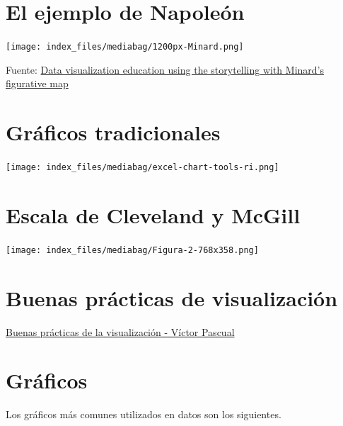 \documentclass[
  letterpaper,
  DIV=11,
  numbers=noendperiod]{scrreprt}
\begin{document}
\section{El ejemplo de Napoleón}\label{el-ejemplo-de-napoleuxf3n}

\texttt{[image: index\_files/mediabag/1200px-Minard.png]}

Fuente:
\href{https://www.researchgate.net/publication/327579298_Data_visualization_education_using_the_storytelling_with_Minard's_figurative_map}{Data
visualization education using the storytelling with Minard's figurative
map}

\section{Gráficos tradicionales}\label{gruxe1ficos-tradicionales}

\texttt{[image: index\_files/mediabag/excel-chart-tools-ri.png]}

\section{Escala de Cleveland y
McGill}\label{escala-de-cleveland-y-mcgill}

\texttt{[image: index\_files/mediabag/Figura-2-768x358.png]}

\section{Buenas prácticas de
visualización}\label{buenas-pruxe1cticas-de-visualizaciuxf3n}

\href{https://youtu.be/TbE8icMHSzs}{Buenas prácticas de la visualización
- Víctor Pascual}

\section{Gráficos}\label{gruxe1ficos}

Los gráficos más comunes utilizados en datos son los siguientes.
\end{document}
